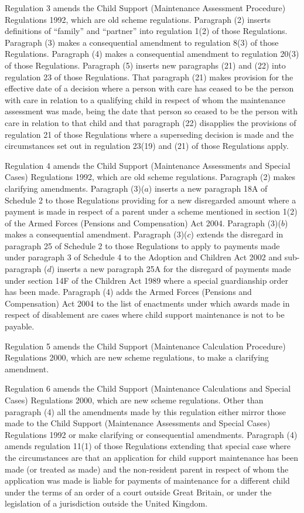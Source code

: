\documentclass[12pt,a4paper]{article}
\begin{document}
Regulation 3 amends the Child Support (Maintenance Assessment Procedure) Regulations 1992, which are old scheme regulations. Paragraph (2) inserts definitions of “family” and “partner” into regulation 1(2) of those Regulations. Paragraph (3) makes a consequential amendment to regulation 8(3) of those Regulations. Paragraph (4) makes a consequential amendment to regulation 20(3) of those Regulations. Paragraph (5) inserts new paragraphs (21) and (22) into regulation 23 of those Regulations. That paragraph (21) makes provision for the effective date of a decision where a person with care has ceased to be the person with care in relation to a qualifying child in respect of whom the maintenance assessment was made, being the date that person so ceased to be the person with care in relation to that child and that paragraph (22) disapplies the provisions of regulation 21 of those Regulations where a superseding decision is made and the circumstances set out in regulation 23(19) and (21) of those Regulations apply.%

Regulation 4 amends the Child Support (Maintenance Assessments and Special Cases) Regulations 1992, which are old scheme regulations. Paragraph (2) makes clarifying amendments. Paragraph (3)($a$)  inserts a new paragraph 18A of Schedule 2 to those Regulations providing for a new disregarded amount where a payment is made in respect of a parent under a scheme mentioned in section 1(2) of the Armed Forces (Pensions and Compensation) Act 2004. Paragraph (3)($b$)  makes a consequential amendment. Paragraph (3)($c$)  extends the disregard in paragraph 25 of Schedule 2 to those Regulations to apply to payments made under paragraph 3 of Schedule 4 to the Adoption and Children Act 2002 and sub-paragraph ($d$)  inserts a new paragraph 25A for the disregard of payments made under section 14F of the Children Act 1989 where a special guardianship order has been made. Paragraph (4) adds the Armed Forces (Pensions and Compensation) Act 2004 to the list of enactments under which awards made in respect of disablement are cases where child support maintenance is not to be payable.%

Regulation 5 amends the Child Support (Maintenance Calculation Procedure) Regulations 2000, which are new scheme regulations, to make a clarifying amendment.

Regulation 6 amends the Child Support (Maintenance Calculations and Special Cases) Regulations 2000, which are new scheme regulations. Other than paragraph (4) all the amendments made by this regulation either mirror those made to the Child Support (Maintenance Assessments and Special Cases) Regulations 1992 or make clarifying or consequential amendments. Paragraph (4) amends regulation 11(1) of those Regulations extending that special case where the circumstances are that an application for child support maintenance has been made (or treated as made) and the non-resident parent in respect of whom the application was made is liable for payments of maintenance for a different child under the terms of an order of a court outside Great Britain, or under the legislation of a jurisdiction outside the United Kingdom.%
\end{document}
